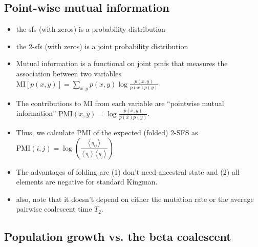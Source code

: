 \documentclass[11pt, letterpaper]{article}   	%
\newcommand{\E}[1]{\left< #1 \right>}
\begin{document}
\subsection*{Point-wise mutual information}
\begin{itemize}
    \item the sfs (with zeros) is a probability distribution
    \item the 2-sfs (with zeros) is a joint probability distribution
    \item Mutual information is a functional on joint pmfs that measures the association between two variables $\text{MI}[p(x,y)] = \sum_{x,y} p(x,y) \log \frac{p(x,y)}{p(x)p(y)}$
    \item The contributions to MI from each variable are ``pointwise mutual information'' $\text{PMI}(x,y) = \log \frac{p(x,y)}{p(x)p(y)}$.
    \item Thus, we calculate PMI of the expected (folded) 2-SFS as $\text{PMI}(i,j) = \log \left( \frac{\E{\eta_{ij}}}{\E{\eta_i} \E{\eta_j}} \right)$
    \item The advantages of folding are (1) don't need ancestral state and (2) all elements are negative for standard Kingman.
    \item also, note that it doesn't depend on either the mutation rate or the average pairwise coalescent time $T_2$.
\end{itemize}

\subsection*{Population growth vs. the beta coalescent}
\end{document}
